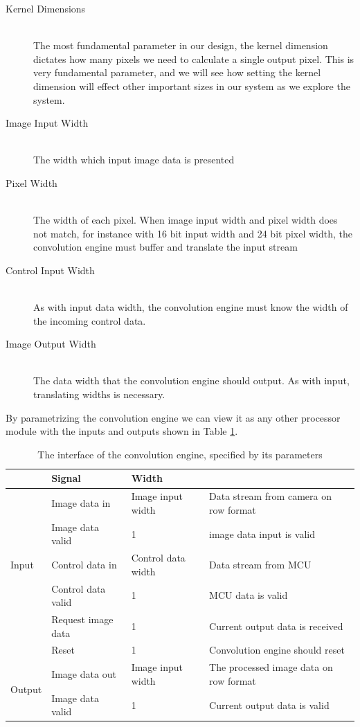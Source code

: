 \begin{description}
    \item[Kernel Dimensions] \hfill \\
        The most fundamental parameter in our design, the kernel dimension dictates how many pixels we need to calculate a single output pixel.
        This is very fundamental parameter, and we will see how setting the kernel dimension will effect other important sizes in our system as we explore the system.
    \item[Image Input Width] \hfill \\
        The width which input image data is presented 
    \item[Pixel Width] \hfill \\
        The width of each pixel. When image input width and pixel width does not match, for instance with 16 bit input width and 24 bit pixel width, the convolution engine must buffer and translate the input stream 
    \item[Control Input Width] \hfill \\
        As with input data width, the convolution engine must know the width of the incoming control data.
    \item[Image Output Width] \hfill \\
        The data width that the convolution engine should output. As with input, translating widths is necessary.
\end{description}

By parametrizing the convolution engine we can view it as any other processor module with the inputs and outputs shown in Table \ref{tbl:ConvolutionEngineIO}.

\begin{table}[h]
    \begin{tabular}{l | l | l | l }
        &   Signal & Width\\
        \hline
        \multirow{5}{*}{Input}
        &   Image data in           & Image input width     & Data stream from camera on row format
        \\
        &   Image data valid        & 1                     & image data input is valid
        \\
        &   Control data in         & Control data width    & Data stream from MCU
        \\
        &   Control data valid      & 1                     & MCU data is valid
        \\
        &   Request image data      & 1                     & Current output data is received
        \\
        &   Reset                   & 1                     & Convolution engine should reset
        \\\hline
        \multirow{2}{*}{Output}
        &   Image data out          & Image input width     & The processed image data on row format\\
        &   Image data valid        & 1                     & Current output data is valid
    \end{tabular}
    \caption{The interface of the convolution engine, specified by its parameters}
    \label{tbl:ConvolutionEngineIO}
\end{table}

